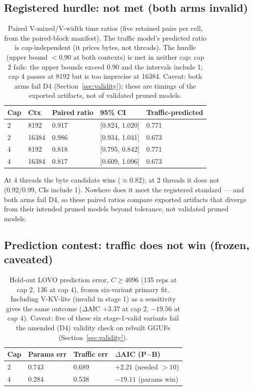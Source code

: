 \documentclass[10pt,letterpaper,twocolumn]{article}
\begin{document}
\subsection{Registered hurdle: not met (both arms invalid)}
\label{sec:hurdle}
\begin{table}[ht]
\centering\small
\begin{tabular}{@{}lllll@{}}
\toprule
Cap & Ctx & Paired ratio & 95\% CI & Traffic-predicted \\
\midrule
2 & 8192 & 0.917 & [0.824, 1.020] & 0.771 \\
2 & 16384 & 0.986 & [0.934, 1.041] & 0.673 \\
4 & 8192 & 0.818 & [0.795, 0.842] & 0.771 \\
4 & 16384 & 0.817 & [0.609, 1.096] & 0.673 \\
\bottomrule
\end{tabular}
\caption{Paired V-mixed/V-width time ratios (five retained
pairs per cell, from the paired-block manifest). The
traffic model's predicted ratio is cap-independent (it prices
bytes, not threads). The
hurdle (upper bound $<0.90$ at both contexts) is met in neither cap:
cap 2 fails: the upper bounds exceed 0.90 and the intervals include 1; cap 4 passes at 8192 but is too imprecise at 16384. Caveat: both arms fail D4
(Section~\ref{sec:validity}); these are timings of the exported
artifacts, not of validated pruned models.}
\end{table}
At 4 threads the byte candidate wins ($\approx$0.82); at 2 threads it does not (0.92/0.99, CIs include 1). Nowhere does it meet the registered standard --- and both arms fail D4, so these paired ratios compare exported artifacts that diverge from their intended pruned models beyond tolerance, not validated pruned models. \subsection{Prediction contest: traffic does not win (frozen, caveated)}
\label{sec:contest}
\begin{table}[ht]
\centering\footnotesize\setlength{\tabcolsep}{4pt}
\begin{tabular}{@{}llll@{}}
\toprule
Cap & Params err & Traffic err & $\Delta$AIC (P$-$B) \\
\midrule
2 & 0.743 & 0.689 & $+2.21$ (needed $>10$) \\
4 & 0.284 & 0.538 & $-19.11$ (params win) \\
\bottomrule
\end{tabular}
\caption{Held-out LOVO prediction error, $C\geq4096$ (135 reps at
cap 2, 136 at cap 4), frozen six-variant primary fit. Including
V-KV-lite (invalid in stage 1) as a sensitivity gives the same outcome
($\Delta$AIC $+3.37$ at cap 2, $-19.56$ at cap 4). Caveat: five of these six
stage-1-valid variants fail the amended (D4) validity check on rebuilt GGUFs
(Section~\ref{sec:validity}).}
\end{table}
\end{document}
